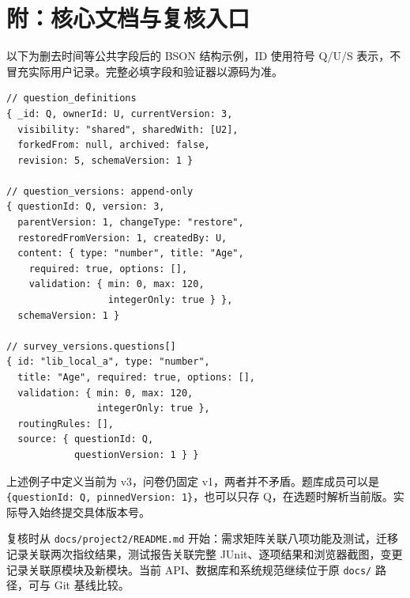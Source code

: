 \documentclass[UTF8,10pt,a4paper,twocolumn,fontset=none]{ctexart}
\begin{document}
\section*{附：核心文档与复核入口}
以下为删去时间等公共字段后的 BSON 结构示例，ID 使用符号 Q/U/S 表示，不冒充实际用户记录。完整必填字段和验证器以源码为准。
\newpage
\begin{lstlisting}
// question_definitions
{ _id: Q, ownerId: U, currentVersion: 3,
  visibility: "shared", sharedWith: [U2],
  forkedFrom: null, archived: false,
  revision: 5, schemaVersion: 1 }

// question_versions: append-only
{ questionId: Q, version: 3,
  parentVersion: 1, changeType: "restore",
  restoredFromVersion: 1, createdBy: U,
  content: { type: "number", title: "Age",
    required: true, options: [],
    validation: { min: 0, max: 120,
                  integerOnly: true } },
  schemaVersion: 1 }

// survey_versions.questions[]
{ id: "lib_local_a", type: "number",
  title: "Age", required: true, options: [],
  validation: { min: 0, max: 120,
                integerOnly: true },
  routingRules: [],
  source: { questionId: Q,
            questionVersion: 1 } }
\end{lstlisting}
上述例子中定义当前为 v3，问卷仍固定 v1，两者并不矛盾。题库成员可以是 \texttt{\{questionId: Q, pinnedVersion: 1\}}，也可以只存 Q，在选题时解析当前版。实际导入始终提交具体版本号。

复核时从 \texttt{docs/project2/README.md} 开始：需求矩阵关联八项功能及测试，迁移记录关联两次指纹结果，测试报告关联完整 JUnit、逐项结果和浏览器截图，变更记录关联原模块及新模块。当前 API、数据库和系统规范继续位于原 \texttt{docs/} 路径，可与 Git 基线比较。
\end{document}
